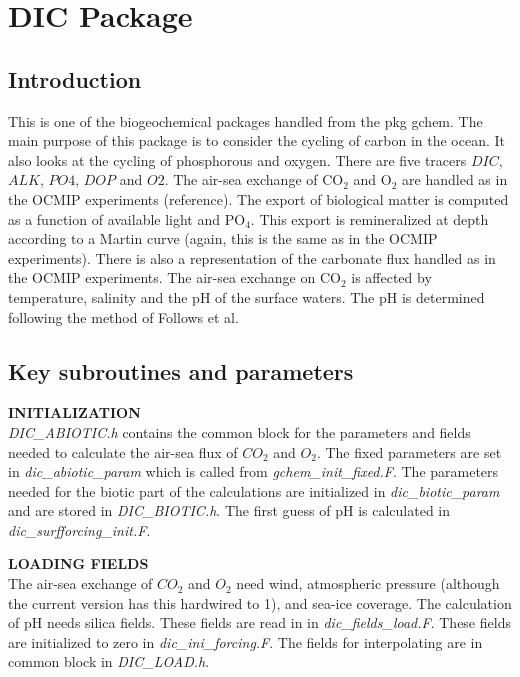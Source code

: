 \section {DIC Package} 

\subsection {Introduction}
This is one of the biogeochemical packages handled from the
pkg gchem. The main purpose of this package is to consider
the cycling of carbon in the ocean. It also looks at the
cycling of phosphorous and oxygen. There are five tracers
$DIC$, $ALK$, $PO4$, $DOP$ and $O2$. The air-sea exchange
of CO$_2$ and O$_2$ are handled as in the OCMIP experiments
(reference). The export of biological matter is computed
as a function of available light and PO$_4$. This export is
remineralized at depth according to a Martin curve (again,
this is the same as in the OCMIP experiments). There is
also a representation of the carbonate flux handled as in
the OCMIP experiments. The air-sea exchange on CO$_2$
is affected by temperature, salinity and the pH of the
surface waters. The pH is determined following the
method of Follows et al. 

\subsection {Key subroutines and parameters}

\noindent
{{\bf INITIALIZATION}} \\
{\it DIC\_ABIOTIC.h} contains the common block for the 
parameters and fields needed to calculate the air-sea
flux of $CO_2$ and $O_2$. The fixed parameters are set in
{\it dic\_abiotic\_param} which is called from {\it gchem\_init\_fixed.F}.
The parameters needed for the biotic part of the calculations
are initialized in {\it dic\_biotic\_param} and are stored
in {\it DIC\_BIOTIC.h}. The first guess of pH is calculated
in {\it dic\_surfforcing\_init.F}.

\vspace{.5cm}

\noindent
{{\bf LOADING FIELDS}}\\
The air-sea exchange of $CO_2$ and $O_2$ need wind, atmospheric
pressure (although the current version has this hardwired to 1),
and sea-ice coverage. The calculation of pH needs silica fields.
These fields are read in in {\it dic\_fields\_load.F}. These
fields are initialized to zero in {\it dic\_ini\_forcing.F}.
The fields for interpolating are in common block in 
{\it DIC\_LOAD.h}.

